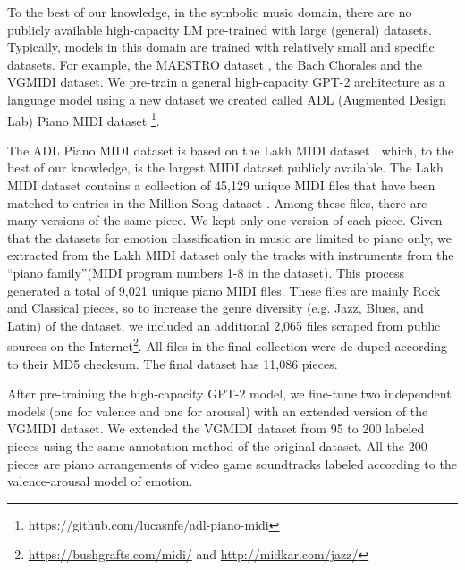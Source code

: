 To the best of our knowledge, in the symbolic music domain, there are no publicly available high-capacity LM pre-trained with large (general) datasets. Typically, models in this domain are trained with relatively small and specific datasets. For example, the MAESTRO dataset \cite{hawthorne2018enabling}, the Bach Chorales \cite{hadjeres2017deepbach} and the VGMIDI \cite{ferreira_2019} dataset. We pre-train a general high-capacity GPT-2 architecture as a language model \cite{radford2019language} using a new dataset we created called ADL (Augmented Design Lab) Piano MIDI dataset \footnote{https://github.com/lucasnfe/adl-piano-midi}.

The ADL Piano MIDI dataset is based on the Lakh MIDI dataset \cite{raffel2016learning}, which, to the best of our knowledge,
is the largest MIDI dataset publicly available. The Lakh MIDI dataset contains a collection of 45,129 unique MIDI files that
have been matched to entries in the Million Song dataset \cite{bertin2011million}. Among these files, there are many versions of the same piece. We kept only one version of each piece. Given that the datasets for emotion classification in music are limited to piano only, we extracted from the Lakh MIDI dataset only the tracks with instruments from the ``piano family''(MIDI program numbers 1-8 in the dataset).
This process generated a total of 9,021 unique piano MIDI files. These files are mainly Rock and Classical pieces, so to increase the genre diversity (e.g. Jazz, Blues, and Latin) of the dataset, we
included an additional 2,065 files scraped from public sources on the Internet\footnote{\url{https://bushgrafts.com/midi/} and \url{http://midkar.com/jazz/}}. All files in the final collection were de-duped according to their MD5 checksum. The final dataset has 11,086 pieces.

After pre-training the high-capacity GPT-2 model, we
fine-tune two independent models (one for valence and one for arousal) with an extended version of the VGMIDI dataset\cite{ferreira_2019}.
We extended the VGMIDI dataset from 95 to 200 labeled pieces using the same annotation method of the original dataset.
All the 200 pieces are piano arrangements of video game soundtracks labeled according to the valence-arousal model of emotion.

